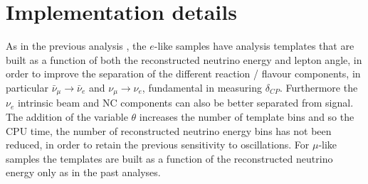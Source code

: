 
%
%

\section{Implementation details}
\label{app:fitter_details}

As in the previous analysis \cite{OurRun17cCC1piJointAnalysis3Flavour}, the $e$-like samples have analysis templates that are built as a function of both the reconstructed neutrino energy and lepton angle, in order to improve the separation of the different reaction / flavour components, in particular $\bar{\nu}_{\mu} \rightarrow \bar{\nu}_e$ and $\nu_{\mu} \rightarrow \nu_e$, fundamental in measuring $\delta_{CP}$.
Furthermore the $\nu_e$ intrinsic beam and NC components can also be better separated from signal. The addition of the variable $\theta$ increases the number of template bins and so the CPU time, the number of reconstructed neutrino energy bins has not been reduced, in order to retain the previous sensitivity to oscillations. For $\mu$-like samples the templates are built as a function of the reconstructed neutrino energy only as in the past analyses.

\clearpage





